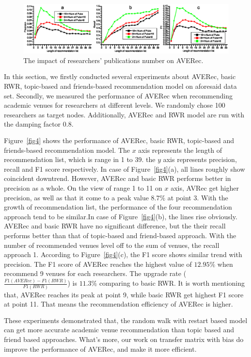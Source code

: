 \documentclass[9pt]{acm_proc_article-sp}
\begin{document}
\begin{figure}[t]
\centering
\includegraphics [width=\textwidth]{Fig5.eps}
\caption{The impact of researchers' publications number on AVERec.}
\label{fig5}
\end{figure}
In this section, we firstly conducted several experiments about AVERec, basic RWR, topic-based and friends-based recommendation model on aforesaid data set. Secondly, we measured the performance of AVERec when recommending academic venues for researchers at different levels. We randomly chose 100 researchers as target nodes. Additionally, AVERec and RWR model are run with the damping factor 0.8.

Figure~\ref{fig4} shows the performance of AVERec, basic RWR, topic-based and friends-based recommendation model. The $x$ axis represents the length of recommendation list, which is range in 1 to 39. the $y$ axis represents precision, recall and F1 score respectively. In case of Figure~\ref{fig4}(a), all lines roughly show coincident downtrend. However, AVERec and basic RWR performs better in precision as a whole. On the view of range 1 to 11 on $x$ axis, AVRec get higher precision, as well as that it come to a peak value $8.7\%$ at point 3. With the growth of recommendation list, the performance of the four recommendation approach tend to be similar.In case of Figure~\ref{fig4}(b), the lines rise obviously. AVERec and basic RWR have no significant difference, but the their recall performs better than that of topic-based and friend-based approach. With the number of recommended venues level off to the sum of venues, the recall approach 1. According to Figure~\ref{fig4}(c), the F1 score shows similar trend with precision. The F1 score of AVERec reaches the highest value of $12.95\%$ when recommend 9 venues for each researchers. The upgrade rate ($\frac{F1(AVERec)-F1(RWR)}{F1(RWR)}$) is $11.3\%$ comparing to basic RWR. It is worth mentioning that, AVERec reaches its peak at point 9, while basic RWR get highest F1 score at point 11. That means the recommendation efficiency of AVERec is higher.

These experiments demonstrated that, the random walk with restart based model can get more accurate academic venue recommendation than topic based and friend based approaches. What's more, our work on transfer matrix with bias do improve the performance of AVERec, and make it more efficient.
\end{document}

